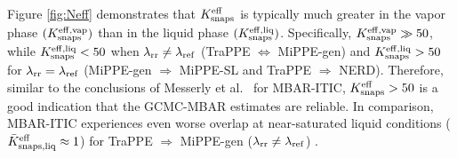 \documentclass[journal=jced,manuscript=article]{achemso}
\begin{document}


Figure \ref{fig:Neff} demonstrates that $K_{\rm snaps}^{\rm eff}$ is typically much greater in the vapor phase $(K_{\rm snaps}^{\rm eff, vap})$ than in the liquid phase $(K_{\rm snaps}^{\rm eff, liq})$. Specifically, $K_{\rm snaps}^{\rm eff, vap} \gg 50$, while $K_{\rm snaps}^{\rm eff, liq} < 50$ when $\lambda_{\rm rr} \neq \lambda_{\rm ref}$ (TraPPE $\Leftrightarrow$ MiPPE-gen) and $K_{\rm snaps}^{\rm eff, liq} > 50$ for $\lambda_{\rm rr} = \lambda_{\rm ref}$ (MiPPE-gen $\Rightarrow$ MiPPE-SL and TraPPE $\Rightarrow$ NERD). Therefore, similar to the conclusions of Messerly et al.~\cite{Postdoc_1} for MBAR-ITIC, $K_{\rm snaps}^{\rm eff} > 50$ is a good indication that the GCMC-MBAR estimates are reliable. In comparison, MBAR-ITIC experiences even worse overlap at near-saturated liquid conditions ($\bar K_{\rm snaps, liq}^{\rm eff} \approx 1$) for TraPPE $\Rightarrow$ MiPPE-gen ($\lambda_{\rm rr} \neq \lambda_{\rm ref}$) \cite{Postdoc_1}.
\end{document}
